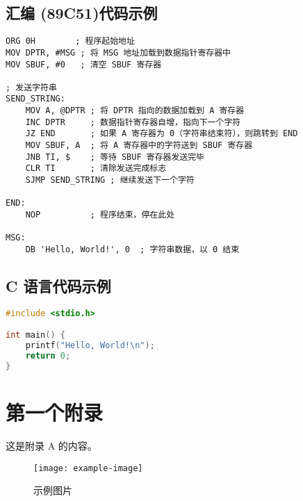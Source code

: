 \documentclass[UTF8,AutoFakeBold=1,AutoFakeSlant,zihao=-4]{SCAU}
\begin{document}
{\subsection{汇编 (89C51)代码示例}
\begin{lstlisting}[language={[x86masm]Assembler}]
ORG 0H        ; 程序起始地址
MOV DPTR, #MSG ; 将 MSG 地址加载到数据指针寄存器中
MOV SBUF, #0   ; 清空 SBUF 寄存器

; 发送字符串
SEND_STRING:
    MOV A, @DPTR ; 将 DPTR 指向的数据加载到 A 寄存器
    INC DPTR     ; 数据指针寄存器自增，指向下一个字符
    JZ END       ; 如果 A 寄存器为 0（字符串结束符），则跳转到 END
    MOV SBUF, A  ; 将 A 寄存器中的字符送到 SBUF 寄存器
    JNB TI, $    ; 等待 SBUF 寄存器发送完毕
    CLR TI       ; 清除发送完成标志
    SJMP SEND_STRING ; 继续发送下一个字符

END:
    NOP          ; 程序结束，停在此处

MSG:
    DB 'Hello, World!', 0  ; 字符串数据，以 0 结束
\end{lstlisting}

\subsection{C 语言代码示例}
\begin{lstlisting}[language=C]
#include <stdio.h>

int main() {
    printf("Hello, World!\n");
    return 0;
}
\end{lstlisting}
\clearpage{} %

\nocite{*}      %



\appendix       %

\section{第一个附录}
这是附录 A 的内容。

\begin{figure}[htbp]
  \centering
  \texttt{[image: example-image]}
  \caption{示例图片}
  \label{fig:A1}
\end{figure}


}
\end{document}
